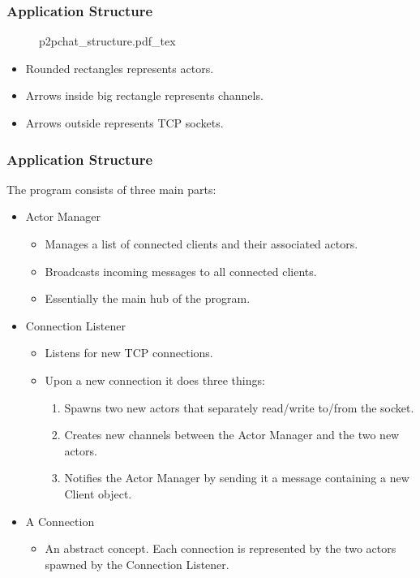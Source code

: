 \begin{frame}
  \frametitle{Application Structure}
  \begin{figure}
    \def\svgwidth{0.7\textwidth}
    {p2pchat_structure.pdf_tex}
  \end{figure}

  \begin{itemize}
    \item<2-> Rounded rectangles represents actors.
    \item<3-> Arrows inside big rectangle represents channels.
    \item<4-> Arrows outside represents TCP sockets.
  \end{itemize}
\end{frame}

\begin{frame}
  \frametitle{Application Structure}
  The program consists of three main parts:
  \begin{itemize}
    \item<2-> Actor Manager
      \begin{itemize}
        \item<5-> Manages a list of connected clients and their associated actors.
        \item<6-> Broadcasts incoming messages to all connected clients.
        \item<7-> Essentially the main hub of the program.
      \end{itemize}

    \item<3-> Connection Listener
      \begin{itemize}
        \item<8-> Listens for new TCP connections.
        \item<9-> Upon a new connection it does three things:
          \begin{enumerate}
            \item<10-> Spawns two new actors that separately read/write to/from the socket.
            \item<11-> Creates new channels between the Actor Manager and the two new actors.
            \item<12-> Notifies the Actor Manager by sending it a message containing a new Client object.
          \end{enumerate}
      \end{itemize}

    \item<4-> A Connection
      \begin{itemize}
        \item<13-> An abstract concept. Each connection is represented by the two actors spawned by the Connection Listener.
      \end{itemize}
  \end{itemize}
\end{frame}

